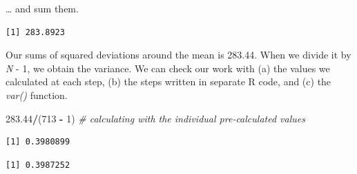 \documentclass[
  11pt,
]{book}
\newenvironment{Shaded}{\begin{snugshade}}{\end{snugshade}}
\newcommand{\AttributeTok}[1]{\textcolor[rgb]{0.27,0.27,0.27}{#1}}
\newcommand{\CommentTok}[1]{\textcolor[rgb]{0.37,0.37,0.37}{\textit{#1}}}
\newcommand{\ConstantTok}[1]{\textcolor[rgb]{0.37,0.37,0.37}{#1}}
\newcommand{\DecValTok}[1]{\textcolor[rgb]{0.06,0.06,0.06}{#1}}
\newcommand{\FloatTok}[1]{\textcolor[rgb]{0.06,0.06,0.06}{#1}}
\newcommand{\FunctionTok}[1]{\textcolor[rgb]{0.27,0.27,0.27}{\textbf{#1}}}
\newcommand{\NormalTok}[1]{#1}
\newcommand{\SpecialCharTok}[1]{\textcolor[rgb]{0.43,0.43,0.43}{\textbf{#1}}}
\begin{document}
\ldots{} and sum them.

\begin{Shaded}
\end{Shaded}

\begin{verbatim}
[1] 283.8923
\end{verbatim}

Our sums of squared deviations around the mean is 283.44. When we divide it by \emph{N} - 1, we obtain the variance. We can check our work with (a) the values we calculated at each step, (b) the steps written in separate R code, and (c) the \emph{var()} function.

\begin{Shaded}
\begin{Highlighting}[]
\FloatTok{283.44}\SpecialCharTok{/}\NormalTok{(}\DecValTok{713} \SpecialCharTok{{-}} \DecValTok{1}\NormalTok{)  }\CommentTok{\# calculating with the individual pre{-}calculated values}
\end{Highlighting}
\end{Shaded}

\begin{verbatim}
[1] 0.3980899
\end{verbatim}

\begin{Shaded}
\end{Shaded}

\begin{verbatim}
[1] 0.3987252
\end{verbatim}

\begin{Shaded}
\end{Shaded}
\end{document}
